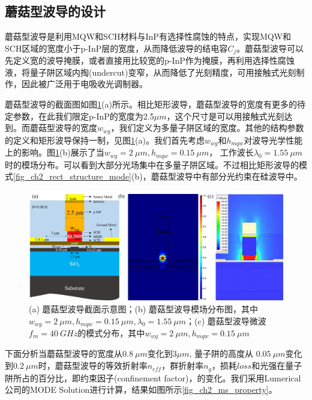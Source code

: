 \subsection{蘑菇型波导的设计}
蘑菇型波导是利用MQW和SCH材料与InP有选择性腐蚀的特点，实现MQW和SCH区域的宽度小于p-InP层的宽度，从而降低波导的结电容$C_j$。蘑菇型波导可以先定义宽的波导掩膜，或者直接用比较宽的p-InP作为掩膜，再利用选择性腐蚀液，将量子阱区域内掏(undercut)变窄，从而降低了光刻精度，可用接触式光刻制作，因此被广泛用于电吸收光调制器\cite{chiu2005enhanced, kuo2008high, tang201150, tang2012over, tang2012energy, chen2011forty}。

蘑菇型波导的截面图如图\ref{fig_ch2_ms_structure_mode}(a)所示。相比矩形波导，蘑菇型波导的宽度有更多的待定参数，在此我们限定p-InP的宽度为2.5$\mu m$，这个尺寸是可以用接触式光刻达到。而蘑菇型波导的宽度$w_{wg}$，我们定义为多量子阱区域的宽度。其他的结构参数的定义和矩形波导保持一制，见图\ref{fig_ch2_ms_structure_mode}(a)。我们首先考虑$w_{wg}$和$h_{mqw}$对波导光学性能上的影响。图\ref{fig_ch2_ms_structure_mode}(b)展示了当$w_{wg} = 2 ~\mu m, h_{mqw} = 0.15 ~\mu m$， 工作波长$\lambda_0 = 1.55~\mu m$时的模场分布。可以看到大部分光场集中在多量子阱区域。不过相比矩形波导的模式\ref{fig_ch2_rect_structure_mode}(b)，蘑菇型波导中有部分光约束在硅波导中。
\begin{figure}[htb]
	\centering
	\includegraphics[width=16cm]{./Pictures/fig_ch2_ms_structure_mode.jpg}
	\caption{(a) 蘑菇型波导截面示意图；(b) 蘑菇型波导模场分布图，其中$w_{wg} = 2~ \mu m, h_{mqw} = 0.15 ~\mu m, \lambda_0 = 1.55~\mu m$；(c) 蘑菇型波导微波$f_m = 40~GHz$的模式分布，其中$w_{wg} = 2~\mu m, h_{mqw} = 0.15~\mu m$}
	\label{fig_ch2_ms_structure_mode}
\end{figure}

下面分析当蘑菇型波导的宽度从$0.8 ~\mu m$变化到$3 \mu m$, 量子阱的高度从 $0.05 ~\mu m$变化到$0.2 ~\mu m$时，蘑菇型波导的等效折射率$n_{eff}$，群折射率$n_g$，损耗$loss$和光强在量子阱所占的百分比，即约束因子(confinement factor)，的变化。我们采用Lumerical公司的MODE Solution进行计算\cite{modesolution}，结果如图所示\ref{fig_ch2_ms_property}。

